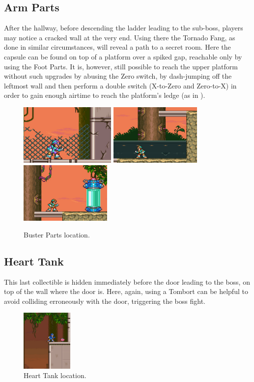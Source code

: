 \subsection{Arm Parts} 
After the hallway, before descending the ladder leading to the sub-boss, players may notice a cracked wall at the very end. Using there the Tornado Fang, as done in similar circumstances, will reveal a path to a secret room. Here the capsule can be found on top of a platform over a spiked gap, reachable only by using the Foot Parts. It is, however, still possible to reach the upper platform without such upgrades by abusing the Zero switch, by dash-jumping off the leftmost wall and then perform a double switch (X-to-Zero and Zero-to-X) in order to gain enough airtime to reach the platform's ledge (as in ).
\begin{figure}[htp]
	\centering
	\includegraphics[height=3cm]{figures/X3/Neon_tiger/Armor_1.png}
	\includegraphics[height=3cm]{figures/X3/Neon_tiger/Armor_2.png}\vspace{2pt}\\
	\includegraphics[height=3cm]{figures/X3/Neon_tiger/Armor_3.png}
	\caption{Buster Parts location.}
\end{figure}


\subsection{Heart Tank}
This last collectible is hidden immediately before the door leading to the boss, on top of the wall where the door is. Here, again, using a Tombort can be helpful to avoid colliding erroneously with the door, triggering the boss fight.
\begin{figure}[htp]
	\centering
	\includegraphics[height=3cm]{figures/X3/Neon_tiger/heart.jpg}
	\caption{Heart Tank location.}
\end{figure}


